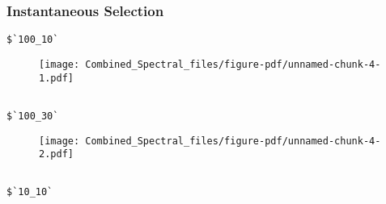 \documentclass[
  letterpaper,
  DIV=11,
  numbers=noendperiod]{scrartcl}
\newenvironment{Shaded}{\begin{snugshade}}{\end{snugshade}}
\newcommand{\FunctionTok}[1]{\textcolor[rgb]{0.28,0.35,0.67}{#1}}
\newcommand{\NormalTok}[1]{\textcolor[rgb]{0.00,0.23,0.31}{#1}}
\newcommand{\OtherTok}[1]{\textcolor[rgb]{0.00,0.23,0.31}{#1}}
\newcommand{\SpecialCharTok}[1]{\textcolor[rgb]{0.37,0.37,0.37}{#1}}
\newcommand{\StringTok}[1]{\textcolor[rgb]{0.13,0.47,0.30}{#1}}
\begin{document}
\hypertarget{instantaneous-selection}{%
\subsubsection{Instantaneous Selection}\label{instantaneous-selection}}

\begin{Shaded}
\end{Shaded}

\begin{verbatim}
$`100_10`
\end{verbatim}

\begin{figure}[H]

{\centering \texttt{[image: Combined\_Spectral\_files/figure-pdf/unnamed-chunk-4-1.pdf]}

}

\end{figure}

\begin{verbatim}

$`100_30`
\end{verbatim}

\begin{figure}[H]

{\centering \texttt{[image: Combined\_Spectral\_files/figure-pdf/unnamed-chunk-4-2.pdf]}

}

\end{figure}

\begin{verbatim}

$`10_10`
\end{verbatim}
\end{document}
